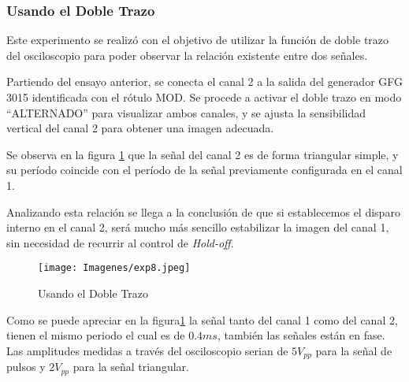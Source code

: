 \subsubsection{Usando el Doble Trazo}

Este experimento se realizó con el objetivo de utilizar la función de doble trazo del osciloscopio para poder observar la relación existente entre dos señales.

Partiendo del ensayo anterior, se conecta el canal 2 a la salida del generador GFG 3015 identificada con el rótulo MOD. Se procede a activar el doble trazo en modo “ALTERNADO” para visualizar ambos canales, y se ajusta la sensibilidad vertical del canal 2 para obtener una imagen adecuada.

\begin{table}[H]
        \caption{Cuadro de Controles}
        \label{tab:cont8}
\end{table}



Se observa en la figura \ref{fig::TrenDePulsosDobleTrazo} que la señal del canal 2 es de forma triangular simple, y su período coincide con el período de la señal previamente configurada en el canal 1. 

Analizando esta relación se llega a la conclusión de que si establecemos el disparo interno en el canal 2, será mucho más sencillo estabilizar la imagen del canal 1, sin necesidad de recurrir al control de \textit{Hold-off}.

\begin{figure}[H]
    \centering
        \texttt{[image: Imagenes/exp8.jpeg]}
    \caption{Usando el Doble Trazo}
    \label{fig::TrenDePulsosDobleTrazo}
\end{figure}

Como se puede apreciar en la figura\ref{fig::TrenDePulsosDobleTrazo} la señal tanto del canal 1 como del canal 2, tienen el mismo periodo el cual es de $0.4ms$, también las señales están en fase. Las amplitudes medidas a través del osciloscopio serian de $5V_{pp}$ para la señal de pulsos y $2V_{pp}$ para la señal triangular. 

